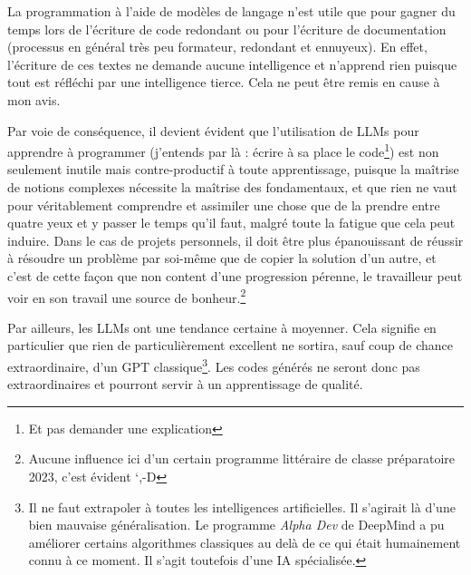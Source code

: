 \documentclass[../../../main.tex]{subfiles}
\begin{document}
La programmation à l'aide de modèles de langage n'est utile que pour gagner du temps lors de l'écriture de code redondant ou pour l'écriture de documentation (processus en général très peu formateur, redondant et ennuyeux). En effet, l'écriture de ces textes ne demande aucune intelligence et n'apprend rien puisque tout est réfléchi par une intelligence tierce. Cela ne peut être remis en cause à mon avis.
 
Par voie de conséquence, il devient évident que l'utilisation de LLMs pour apprendre à programmer (j'entends par là : écrire à sa place le code\footnote{Et pas demander une explication}) est non seulement inutile mais contre-productif à toute apprentissage, puisque la maîtrise de notions complexes nécessite la maîtrise des fondamentaux, et que rien ne vaut pour véritablement comprendre et assimiler une chose que de la prendre entre quatre yeux et y passer le temps qu'il faut, malgré toute la fatigue que cela peut induire. Dans le cas de projets personnels, il doit être plus épanouissant de réussir à résoudre un problème par soi-même que de copier la solution d'un autre, et c'est de cette façon que non content d'une progression pérenne, le travailleur peut voir en son travail une source de bonheur.\footnote{Aucune influence ici d'un certain programme littéraire de classe préparatoire 2023, c'est évident `,-D}
 
Par ailleurs, les LLMs ont une tendance certaine à moyenner. Cela signifie en particulier que rien de particulièrement excellent ne sortira, sauf coup de chance extraordinaire, d'un GPT classique\footnote{Il ne faut extrapoler à toutes les intelligences artificielles. Il s'agirait là d'une bien mauvaise généralisation. Le programme \textit{Alpha Dev} de DeepMind a pu améliorer certains algorithmes classiques au delà de ce qui était humainement connu à ce moment. Il s'agit toutefois d'une IA spécialisée.}. Les codes générés ne seront donc pas extraordinaires et pourront servir à un apprentissage de qualité.
\end{document}
